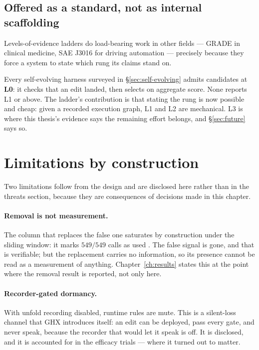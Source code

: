 \subsection*{Offered as a standard, not as internal scaffolding}

Levels-of-evidence ladders do load-bearing work in other fields --- GRADE
in clinical medicine, SAE J3016 for driving automation --- precisely
because they force a system to state which rung its claims stand on.

Every self-evolving harness surveyed in \S\ref{sec:self-evolving} admits
candidates at \textbf{L0}: it checks that an edit landed, then selects on
aggregate score. None reports L1 or above. The ladder's contribution is
that stating the rung is now possible and cheap: given a recorded execution
graph, L1 and L2 are mechanical. L3 is where this thesis's evidence says
the remaining effort belongs, and \S\ref{sec:future} says so.

\section{Limitations by construction}
\label{sec:construction-limits}

Two limitations follow from the design and are disclosed here rather than
in the threats section, because they are consequences of decisions made in
this chapter.

\paragraph{Removal is not measurement.} The column that replaces the false
one saturates by construction under the sliding window: it marks
$549/549$ calls as used . The false signal is gone, and that is
verifiable; but the replacement carries no information, so its presence
cannot be read as a measurement of anything. Chapter~\ref{ch:results} states
this at the point where the removal result is reported, not only here.

\paragraph{Recorder-gated dormancy.} With unfold recording disabled,
runtime rules are mute. This is a silent-loss channel that GHX introduces
itself: an edit can be deployed, pass every gate, and never speak, because
the recorder that would let it speak is off. It is disclosed, and it is
accounted for in the efficacy trials  --- where it turned out to
matter.
